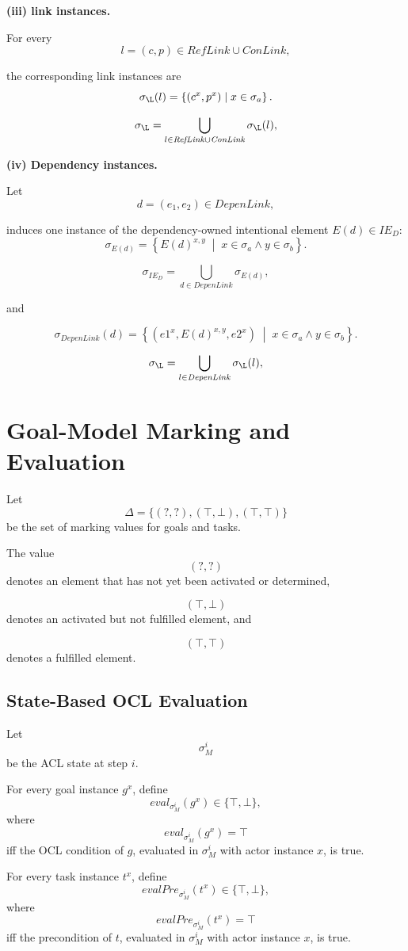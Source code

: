 \documentclass[11pt,a4paper]{article}
\newcommand{\IED}{\mathit{IE}_{D}}
\newcommand{\RefLink}{\mathit{RefLink}}
\newcommand{\ConLink}{\mathit{ConLink}}
\newcommand{\DepenLink}{\mathit{DepenLink}}
\begin{document}
\medskip
\noindent
\textbf{(iii) link instances.}

For every
\[
l = (c,p)\in \RefLink
\cup
\ConLink,
\]

the corresponding link instances are
\[
\sigma_{\L}(l)
=
\left\{
(c^{x},p^{x})
\;\middle|\;
x\in\sigma_a
\right\}.
\]

\[
\sigma_{\L}
=
\bigcup_{l\in \RefLink
\cup
\ConLink}
\sigma_{\L}(l),
\]


\medskip
\noindent
\textbf{(iv) Dependency instances.}

Let
\[
d=(e_1,e_2)\in\DepenLink,
\]

induces one instance of the dependency-owned intentional element
\(E(d)\in\IED\):
\[
\sigma_{E(d)}
=
\left\{
E(d)^{x,y}
\;\middle|\;
x\in\sigma_a
\land
y\in\sigma_b
\right\}.
\]

\[
\sigma_{\IED}
=
\bigcup_{d\in\DepenLink}
\sigma_{E(d)},
\]

and

\[
\sigma_{\DepenLink}(d)
=
\left\{
(e1^{x}, E(d)^{x,y},e2^{x})
\;\middle|\;
x\in\sigma_a
\land
y\in\sigma_b
\right\}.
\]

\[
\sigma_{\L}
=
\bigcup_{l\in \DepenLink}
\sigma_{\L}(l),
\]


\section{Goal-Model Marking and Evaluation}

Let
\[
\Delta
=
\{
(?,?),
(\top,\bot),
(\top,\top)
\}
\]
be the set of marking values for goals and tasks.

The value
\[
(?,?)
\]
denotes an element that has not yet been activated or determined,

\[
(\top,\bot)
\]
denotes an activated but not fulfilled element, and

\[
(\top,\top)
\]
denotes a fulfilled element.


\subsection{State-Based OCL Evaluation}

Let
\[
\sigma_M^i
\]
be the ACL state at step \(i\).

For every goal instance \(g^x\), define
\[
eval_{\sigma_M^i}(g^x)
\in
\{\top,\bot\},
\]
where
\[
eval_{\sigma_M^i}(g^x)=\top
\]
iff the OCL condition of \(g\), evaluated in
\(\sigma_M^i\) with actor instance \(x\), is true.

For every task instance \(t^x\), define
\[
evalPre_{\sigma_M^i}(t^x)
\in
\{\top,\bot\},
\]
where
\[
evalPre_{\sigma_M^i}(t^x)=\top
\]
iff the precondition of \(t\), evaluated in
\(\sigma_M^i\) with actor instance \(x\), is true.
\end{document}
